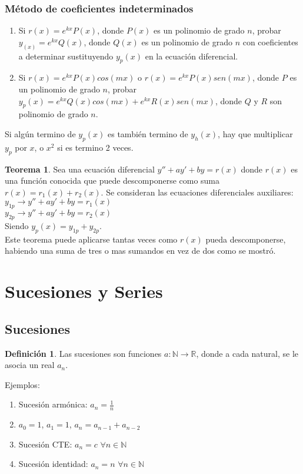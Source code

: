 \documentclass[10pt]{article}
\theoremstyle{definition}
\newtheorem{definition}{Definición}[section]
\newtheorem{theorem}{Teorema}[section]
\begin{document}
\subsubsection{Método de coeficientes indeterminados}
\begin{enumerate}
	\item Si $r(x)=e^{kx}P(x)$, donde $P(x)$ es un polinomio de grado $n$, probar $y_(x)=e^{kx}Q(x)$, donde $Q(x)$ es un polinomio de grado $n$ con coeficientes a determinar sustituyendo $y_p(x)$ en la ecuación diferencial.
	\item Si $r(x)=e^{kx}P(x)cos(mx)$ o $r(x)=e^{kx}P(x)sen(mx)$, donde $P$ es un polinomio de grado $n$, probar $y_p(x)=e^{kx}Q(x)cos(mx)+e^{kx}R(x)sen(mx)$, donde $Q$ y $R$ son polinomio de grado $n$.
\end{enumerate}
Si algún termino de $y_p(x)$ es también termino de $y_h(x)$, hay que multiplicar $y_p$ por $x$, o $x^2$ si es termino 2 veces.
\begin{theorem}
	Sea una ecuación diferencial $y''+ay'+by=r(x)$ donde $r(x)$ es una función conocida que puede descomponerse como suma $r(x)=r_1(x)+r_2(x)$.
	Se consideran las ecuaciones diferenciales auxiliares:\\
	$y_{1p} \rightarrow y''+ay'+by=r_1(x)$\\
	$y_{2p} \rightarrow y''+ay'+by=r_2(x)$\\
	Siendo $y_p(x)=y_{1p}+y_{2p}$.\\Este teorema puede aplicarse tantas veces como $r(x)$ pueda descomponerse, habiendo una suma de tres o mas sumandos en vez de dos como se mostró.
\end{theorem}
\newpage \section{Sucesiones y Series}
\subsection{Sucesiones}
\begin{definition}
	Las sucesiones son funciones $a: \mathbb{N} \rightarrow \mathbb{R}$, donde a cada natural, se le asocia un real $a_n$.
\end{definition}
Ejemplos:
\begin{enumerate}
	\item Sucesión armónica: $a_n=\frac{1}{n}$
	\item $a_0=1$, $a_1=1$, $a_n=a_{n-1}+a_{n-2}$
	\item Sucesión CTE: $a_n=c$ $\forall n \in \mathbb{N}$
	\item Sucesión identidad: $a_n=n$ $\forall n \in \mathbb{N}$
\end{enumerate}
\end{document}
